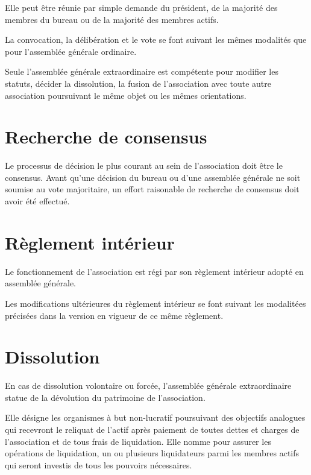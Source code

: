 \documentclass[a4paper, 11pt]{article}
\begin{document}
Elle peut être réunie par simple demande du président, de la majorité des membres du bureau ou de la majorité des
membres actifs.

La convocation, la délibération et le vote se font suivant les mêmes modalités que pour l'assemblée générale ordinaire.

Seule l'assemblée générale extraordinaire est compétente pour modifier les statuts, décider la dissolution, la fusion de
l'association avec toute autre association poursuivant le même objet ou les mêmes orientations.


\section{Recherche de consensus} %

Le processus de décision le plus courant au sein de l'association doit être le consensus. Avant qu'une décision du
bureau ou d'une assemblée générale ne soit soumise au vote majoritaire, un effort raisonable de recherche de consensus
doit avoir été effectué.


\section{Règlement intérieur} %

Le fonctionnement de l'association est régi par son règlement intérieur adopté en assemblée générale.

Les modifications ultérieures du règlement intérieur se font suivant les modalitées précisées dans la version en vigueur
de ce même règlement.


\section{Dissolution} %

En cas de dissolution volontaire ou forcée, l'assemblée générale extraordinaire statue de la dévolution du patrimoine de
l'association.

Elle désigne les organismes à but non-lucratif poursuivant des objectifs analogues qui recevront le reliquat de l'actif
après paiement de toutes dettes et charges de l'association et de tous frais de liquidation. Elle nomme pour assurer les
opérations de liquidation, un ou plusieurs liquidateurs parmi les membres actifs qui seront investis de tous les
pouvoirs nécessaires.
\end{document}
